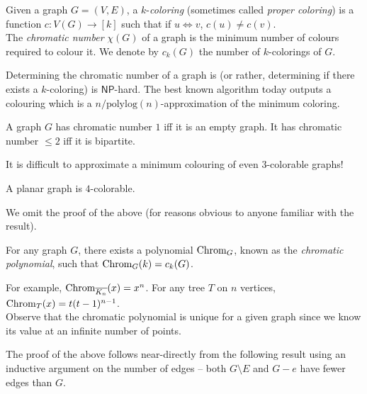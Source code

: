 	\begin{fdef}
		Given a graph $G=(V,E)$, a $k$-\emph{coloring} (sometimes called \emph{proper coloring}) is a function $c:V(G)\to[k]$ such that if $u\Leftrightarrow v$, $c(u) \ne c(v)$.\\
		The \emph{chromatic number} $\chi(G)$ of a graph is the minimum number of colours required to colour it.
		We denote by $c_k(G)$ the number of $k$-colorings of $G$.
	\end{fdef}

	Determining the chromatic number of a graph is (or rather, determining if there exists a $k$-coloring) is $\mathsf{NP}$-hard. The best known algorithm today outputs a colouring which is a $n/\text{polylog}(n)$-approximation of the minimum coloring.

	\begin{prop}
		A graph $G$ has chromatic number $1$ iff it is an empty graph. It has chromatic number $\le 2$ iff it is bipartite.
	\end{prop}

	It is difficult to approximate a minimum colouring of even $3$-colorable graphs!

	\begin{ftheo}
		A planar graph is $4$-colorable.
	\end{ftheo}
	We omit the proof of the above (for reasons obvious to anyone familiar with the result).

	\begin{ftheo}
		For any graph $G$, there exists a polynomial $\operatorname{Chrom}_G$, known as the \emph{chromatic polynomial}, such that $\operatorname{Chrom}_G(k) = c_k(G)$.
	\end{ftheo}
	For example, $\operatorname{Chrom}_{\overline{K_n}}(x) = x^n$. For any tree $T$ on $n$ vertices, $\operatorname{Chrom}_T(x) = t(t-1)^{n-1}$.\\
	Observe that the chromatic polynomial is unique for a given graph since we know its value at an infinite number of points.
	
	The proof of the above follows near-directly from the following result using an inductive argument on the number of edges -- both $G\setminus E$ and $G-e$ have fewer edges than $G$.


